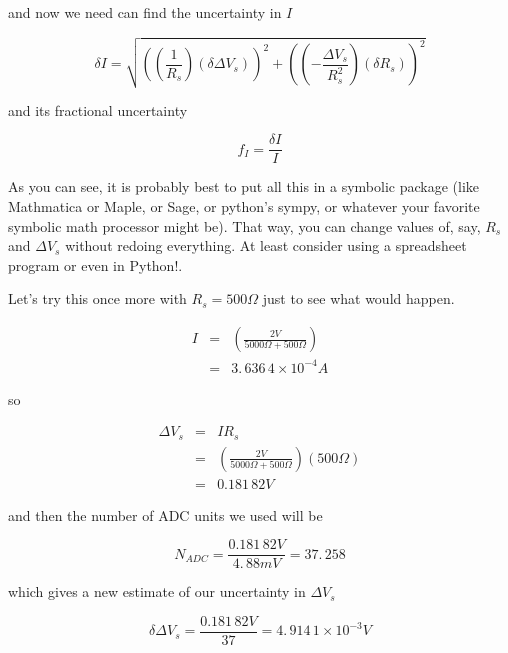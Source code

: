 \noindent and now we need can find the uncertainty in $I$

\begin{equation*}
	\delta I=\sqrt{\left( \left( \frac{1}{R_{s}}\right) \left( \delta \Delta V_{s}\right) \right) ^{2}+\left( \left( -\frac{\Delta V_{s}}{R_{s}^{2}} \right) \left( \delta R_{s}\right) \right) ^{2}}
\end{equation*}

\noindent and its fractional uncertainty

\begin{equation*}
	f_{I}=\frac{\delta I}{I}
\end{equation*}

As you can see, it is probably best to put all this in a symbolic package (like Mathmatica or Maple, or Sage, or python's sympy, or whatever your favorite symbolic math processor might be). That way, you can change values of, say, $R_{s}$ and $\Delta V_{s}$ without redoing everything. At least consider using a spreadsheet program or even in Python!.

Let's try this once more with $R_{s}=500\unit{\Omega}$ just to see what would happen.

\begin{eqnarray*}
	I &=&\left( \frac{2\unit{V}}{5000\unit{\Omega}+500\unit{\Omega}}\right) \\
      &=&3.\,\allowbreak 636\,4\times 10^{-4}\unit{A}
\end{eqnarray*}

\noindent so

\begin{eqnarray*}
	\Delta V_{s} &=&IR_{s} \\
                 &=&\left( \frac{2\unit{V}}{5000\unit{\Omega}+500\unit{\Omega}}\right) \left( 500\unit{\Omega}\right) \\
                 &=&0.181\,82\unit{V}
\end{eqnarray*}

\noindent and then the number of ADC units we used will be 

\begin{equation*}
     N_{ADC}=\frac{0.181\,82\unit{V}}{4.\,\allowbreak 88\unit{mV}}=37.\,\allowbreak 258
\end{equation*}

\noindent which gives a new estimate of our uncertainty in $\Delta V_{s}$ 

\begin{equation*}
    \delta \Delta V_{s}=\frac{0.181\,82\unit{V}}{37}=4.\,\allowbreak914\,1\times 10^{-3}\unit{V}
\end{equation*}

